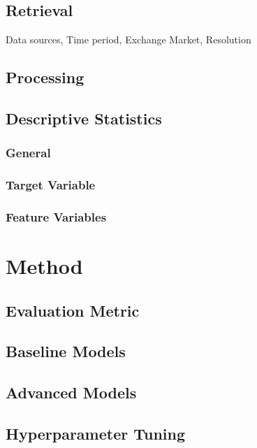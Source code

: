 \documentclass{article}
\begin{document}
	\subsection{Retrieval}
	
	Data sources, Time period, Exchange Market, Resolution
	
	\subsection{Processing}
	
	\subsection{Descriptive Statistics}
	
	\subsubsection{General}
	
	\subsubsection{Target Variable}
	
	\subsubsection{Feature Variables}
	

	\section{Method}
	
	\subsection{Evaluation Metric}
	
	\subsection{Baseline Models}
	
	\subsection{Advanced Models}
	
	\subsection{Hyperparameter Tuning}
	
\end{document}
